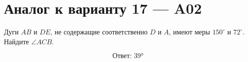 


\section*{Аналог к варианту 17 — A02}
Дуги \(AB\) и \(DE\), не содержащие соответственно \(D\) и \(A\), имеют меры \(150^\circ\) и \(72^\circ\). Найдите \(\angle ACB\).
\begin{center}\end{center}
\[\boxed{\text{Ответ: }39°}\]

